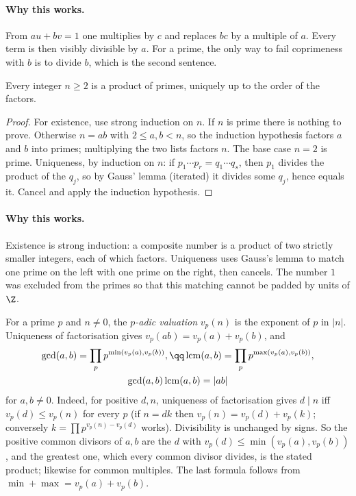 \paragraph{Why this works.}
From $au+bv=1$ one multiplies by $c$ and replaces $bc$ by a multiple of $a$. Every term is then visibly divisible by $a$. For a prime, the only way to fail coprimeness with $b$ is to divide $b$, which is the second sentence.

\begin{theorem}\label{thm:fta}
Every integer $n\ge2$ is a product of primes, uniquely up to the order of the factors.
\end{theorem}
\begin{proof}
For existence, use strong induction on $n$. If $n$ is prime there is nothing to prove. Otherwise $n=ab$ with $2\le a,b<n$, so the induction hypothesis factors $a$ and $b$ into primes; multiplying the two lists factors $n$. The base case $n=2$ is prime. Uniqueness, by induction on $n$: if $p_1\cdots p_r=q_1\cdots q_s$, then $p_1$ divides the product of the $q_j$, so by Gauss' lemma (iterated) it divides some $q_j$, hence equals it. Cancel and apply the induction hypothesis.
\end{proof}

\paragraph{Why this works.}
Existence is strong induction: a composite number is a product of two strictly smaller integers, each of which factors. Uniqueness uses Gauss's lemma to match one prime on the left with one prime on the right, then cancels. The number $1$ was excluded from the primes so that this matching cannot be padded by units of $\Z$.

For a prime $p$ and $n\ne0$, the \emph{$p$-adic valuation} $v_p(n)$ is the exponent of $p$ in $|n|$. Uniqueness of factorisation gives $v_p(ab)=v_p(a)+v_p(b)$, and
\[
\begin{gathered}\gcd(a,b)=\prod_pp^{\min(v_p(a),v_p(b))},\qq\operatorname{lcm}(a,b)=\prod_pp^{\max(v_p(a),v_p(b))},\\\gcd(a,b)\operatorname{lcm}(a,b)=|ab|\end{gathered}
\]
for $a,b\ne0$. Indeed, for positive $d,n$, uniqueness of factorisation gives $d\mid n$ iff $v_p(d)\le v_p(n)$ for every $p$ (if $n=dk$ then $v_p(n)=v_p(d)+v_p(k)$; conversely $k=\prod p^{v_p(n)-v_p(d)}$ works). Divisibility is unchanged by signs. So the positive common divisors of $a,b$ are the $d$ with $v_p(d)\le\min(v_p(a),v_p(b))$, and the greatest one, which every common divisor divides, is the stated product; likewise for common multiples. The last formula follows from $\min+\max=v_p(a)+v_p(b)$.


